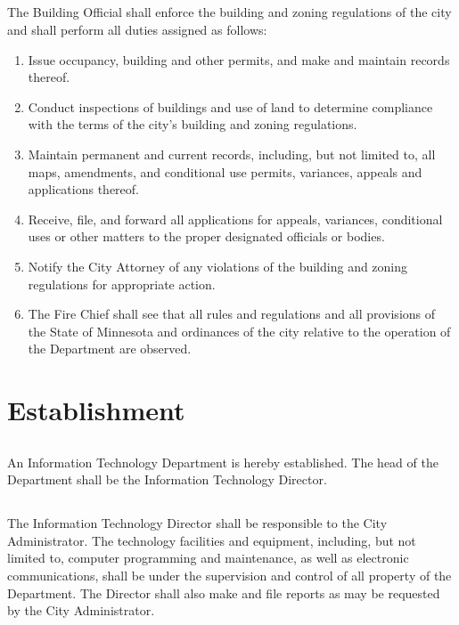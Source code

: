 \subsection{}
The Building Official shall enforce the building and zoning regulations of the city and shall perform all duties assigned as follows:
\begin{enumerate}
    \item Issue occupancy, building and other permits, and make and maintain records thereof.
    \item Conduct inspections of buildings and use of land to determine compliance with the terms of the city’s building and zoning regulations.
    \item Maintain permanent and current records, including, but not limited to, all maps, amendments, and conditional use permits, variances, appeals and applications thereof.
    \item Receive, file, and forward all applications for appeals, variances, conditional uses or other matters to the proper designated officials or bodies.
    \item Notify the City Attorney of any violations of the building and zoning regulations for appropriate action.
    \item The Fire Chief shall see that all rules and regulations and all provisions of the State of Minnesota and ordinances of the city relative to the operation of the Department are observed.
\end{enumerate}

\setcounter{section}{49}
\section{Establishment}
\subsection{}
An Information Technology Department is hereby established. The head of the Department shall be the Information Technology Director.
\subsection{}
The Information Technology Director shall be responsible to the City Administrator. The technology facilities and equipment, including, but not limited to, computer programming and maintenance, as well as electronic communications, shall be under the supervision and control of all property of the Department. The Director shall also make and file reports as may be requested by the City Administrator.\\

